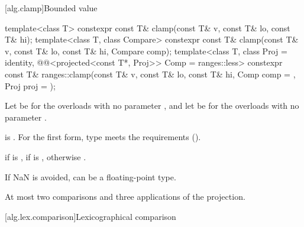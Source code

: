 [alg.clamp]{Bounded value}

%
\begin{itemdecl}
template<class T>
  constexpr const T& clamp(const T& v, const T& lo, const T& hi);
template<class T, class Compare>
  constexpr const T& clamp(const T& v, const T& lo, const T& hi, Compare comp);
template<class T, class Proj = identity,
         @@<projected<const T*, Proj>> Comp = ranges::less>
  constexpr const T&
    ranges::clamp(const T& v, const T& lo, const T& hi, Comp comp = {}, Proj proj = {});
\end{itemdecl}

\begin{itemdescr}
\pnum
Let  be 
for the overloads with no parameter ,
and let  be 
for the overloads with no parameter .

\pnum
\expects
{} is .
For the first form, type 
meets the 
requirements ().

\pnum
\returns
{} if  is ,
 if  is ,
otherwise .

\pnum
\begin{note}
If NaN is avoided,  can be a floating-point type.
\end{note}

\pnum
\complexity
At most two comparisons and three applications of the projection.
\end{itemdescr}

[alg.lex.comparison]{Lexicographical comparison}


